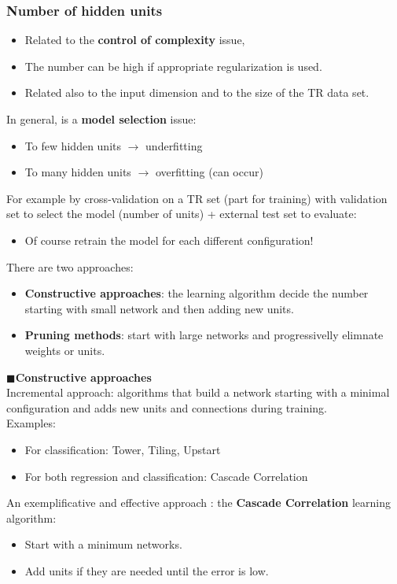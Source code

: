 \documentclass[../main.tex]{subfiles}
\begin{document}
\subsubsection{Number of hidden units}
\begin{itemize}
    \item Related to the \textbf{control of complexity} issue,
    \item The number can be high if appropriate regularization is used.
    \item Related also to the input dimension and to the size of the TR data set.
\end{itemize}
In general, is a \textbf{model selection} issue:
\begin{itemize}
    \item To few hidden units $\rightarrow$ underfitting
    \item To many hidden units $\rightarrow$ overfitting (can occur)
\end{itemize}
For example by cross-validation on a TR set (part for training) with validation set to select the model (number of units) + external test set to evaluate:
\begin{itemize}
    \item Of course retrain the model for each different configuration!
\end{itemize}
There are two approaches:
\begin{itemize}
    \item \textbf{Constructive approaches}: the learning algorithm decide the number starting with small network and then adding new units.
    \item \textbf{Pruning methods}: start with large networks and progressivelly elimnate weights or units.
\end{itemize}
$\blacksquare$\textbf{Constructive approaches}\\
\noindent Incremental approach: algorithms that build a network starting with a minimal configuration and adds new units and connections during training.\\
Examples:
\begin{itemize}
    \item For classification: Tower, Tiling, Upstart
    \item For both regression and classification: Cascade Correlation
\end{itemize}
An exemplificative and effective approach : the \textbf{Cascade Correlation} learning algorithm:
\begin{itemize}
    \item Start with a minimum networks.
    \item Add units if they are needed until the error is low.
\end{itemize}
\end{document}
